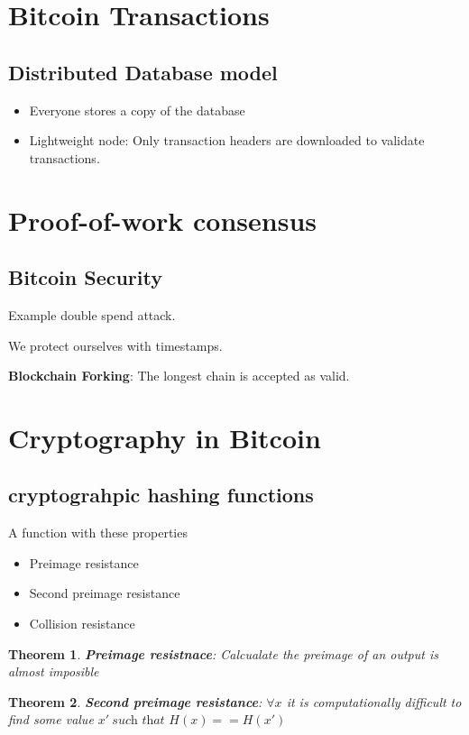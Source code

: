 \documentclass[a4paper, 12pt]{report}
\newtheorem{theorem}{Theorem}
\begin{document}
\section{Bitcoin Transactions}
\subsection{Distributed Database model}
\begin{itemize}
    \item Everyone stores a copy of the database
    \item Lightweight node: Only transaction headers are downloaded
    to validate transactions.
\end{itemize}

\section{Proof-of-work consensus}
\subsection{Bitcoin Security}
Example double spend attack.

We protect ourselves with timestamps.

\textbf{Blockchain Forking}: The longest chain is accepted as valid.
\section{Cryptography in Bitcoin}
\subsection{cryptograhpic hashing functions}
A function with these properties
\begin{itemize}
    \item Preimage resistance
    \item Second preimage resistance
    \item Collision resistance
\end{itemize}
\begin{theorem}
    \textbf{Preimage resistnace}: Calcualate the preimage of an output is almost imposible
\end{theorem}

\begin{theorem}
    \textbf{Second preimage resistance}: 
    $\forall x$ it is computationally difficult
    to find some value $x'\ \textit{such that } H(x)==H(x')$
\end{theorem}
\end{document}
